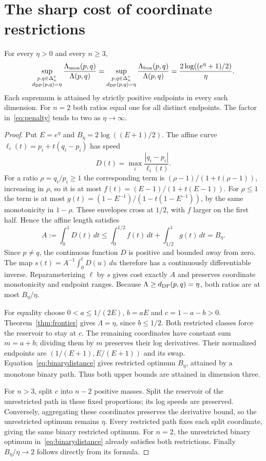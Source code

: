 \section{The sharp cost of coordinate restrictions}
\begin{theorem}\label{thm:shape}
For every $\eta>0$ and every $n\ge3$,
\begin{equation}\label{eq:penalty}
 \sup_{\substack{p,q\in\Delta_n^\circ\\d_{\mathrm{DP}}(p,q)=\eta}}
 \frac{\Lambda_{\mathrm{mon}}(p,q)}{\Lambda(p,q)}
 =\sup_{\substack{p,q\in\Delta_n^\circ\\d_{\mathrm{DP}}(p,q)=\eta}}
 \frac{\Lambda_{\mathrm{box}}(p,q)}{\Lambda(p,q)}
 =\frac{2\log((e^\eta+1)/2)}{\eta}.
\end{equation}
Each supremum is attained by strictly positive endpoints in every such dimension. For $n=2$ both ratios equal one for all distinct endpoints. The factor in~\eqref{eq:penalty} tends to two as $\eta\to\infty$.
\end{theorem}
\begin{proof}
Put $E=e^\eta$ and $B_\eta=2\log((E+1)/2)$. The affine curve $\ell_i(t)=p_i+t(q_i-p_i)$ has speed
\[
 D(t)=\max_i\frac{|q_i-p_i|}{\ell_i(t)}.
\]
For a ratio $\rho=q_i/p_i\ge1$ the corresponding term is
$(\rho-1)/(1+t(\rho-1))$, increasing in $\rho$, so it is at most
$f(t)=(E-1)/(1+t(E-1))$. For $\rho\le1$ the term is at most
$g(t)=(1-E^{-1})/(1-t(1-E^{-1}))$, by the same monotonicity in $1-\rho$.
These envelopes cross at $1/2$, with $f$ larger on the first half. Hence the affine length satisfies
\begin{equation}\label{eq:affinelength}
 A:=\int_0^1D(t)\,dt
 \le\int_0^{1/2}f(t)\,dt+\int_{1/2}^1g(t)\,dt
 =B_\eta.
\end{equation}
Since $p\ne q$, the continuous function $D$ is positive and bounded away from zero. The map $s(t)=A^{-1}\int_0^tD(u)\,du$ therefore has a continuously differentiable inverse. Reparameterizing $\ell$ by $s$ gives cost exactly $A$ and preserves coordinate monotonicity and endpoint ranges. Because $\Lambda\ge d_{\mathrm{DP}}(p,q)=\eta$, both ratios are at most $B_\eta/\eta$.

For equality choose $0<a\le1/(2E)$, $b=aE$ and $c=1-a-b>0$. Theorem~\ref{thm:frontier} gives $\Lambda=\eta$, since $b\le1/2$. Both restricted classes force the reservoir to stay at $c$. The remaining coordinates have constant sum $m=a+b$; dividing them by $m$ preserves their log derivatives. Their normalized endpoints are $(1/(E+1),E/(E+1))$ and its swap. Equation~\eqref{eq:binarydistance} gives restricted optimum $B_\eta$, attained by a monotone binary path. Thus both upper bounds are attained in dimension three.

For $n>3$, split $c$ into $n-2$ positive masses. Split the reservoir of the unrestricted path in these fixed proportions; its log speeds are preserved. Conversely, aggregating these coordinates preserves the derivative bound, so the unrestricted optimum remains $\eta$. Every restricted path fixes each split coordinate, giving the same binary restricted optimum. For $n=2$, the unrestricted binary optimum in~\eqref{eq:binarydistance} already satisfies both restrictions. Finally $B_\eta/\eta\to2$ follows directly from its formula.
\end{proof}

